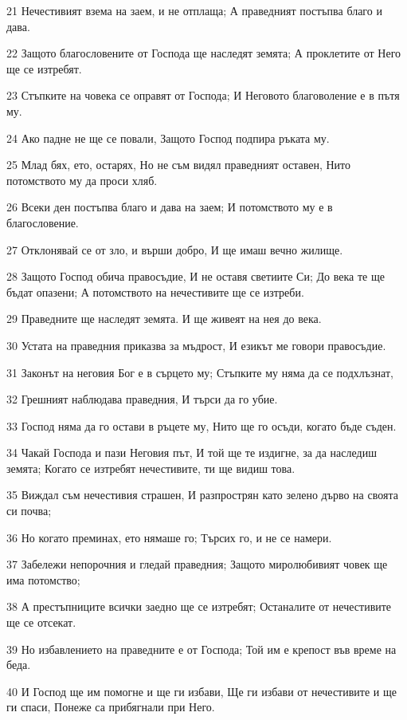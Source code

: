 \par 21 Нечестивият взема на заем, и не отплаща; А праведният постъпва благо и дава.
\par 22 Защото благословените от Господа ще наследят земята; А проклетите от Него ще се изтребят.
\par 23 Стъпките на човека се оправят от Господа; И Неговото благоволение е в пътя му.
\par 24 Ако падне не ще се повали, Защото Господ подпира ръката му.
\par 25 Млад бях, ето, остарях, Но не съм видял праведният оставен, Нито потомството му да проси хляб.
\par 26 Всеки ден постъпва благо и дава на заем; И потомството му е в благословение.
\par 27 Отклонявай се от зло, и върши добро, И ще имаш вечно жилище.
\par 28 Защото Господ обича правосъдие, И не оставя светиите Си; До века те ще бъдат опазени; А потомството на нечестивите ще се изтреби.
\par 29 Праведните ще наследят земята. И ще живеят на нея до века.
\par 30 Устата на праведния приказва за мъдрост, И езикът ме говори правосъдие.
\par 31 Законът на неговия Бог е в сърцето му; Стъпките му няма да се подхлъзнат,
\par 32 Грешният наблюдава праведния, И търси да го убие.
\par 33 Господ няма да го остави в ръцете му, Нито ще го осъди, когато бъде съден.
\par 34 Чакай Господа и пази Неговия път, И той ще те издигне, за да наследиш земята; Когато се изтребят нечестивите, ти ще видиш това.
\par 35 Виждал съм нечестивия страшен, И разпрострян като зелено дърво на своята си почва;
\par 36 Но когато преминах, ето нямаше го; Търсих го, и не се намери.
\par 37 Забележи непорочния и гледай праведния; Защото миролюбивият човек ще има потомство;
\par 38 А престъпниците всички заедно ще се изтребят; Останалите от нечестивите ще се отсекат.
\par 39 Но избавлението на праведните е от Господа; Той им е крепост във време на беда.
\par 40 И Господ ще им помогне и ще ги избави, Ще ги избави от нечестивите и ще ги спаси, Понеже са прибягнали при Него.

